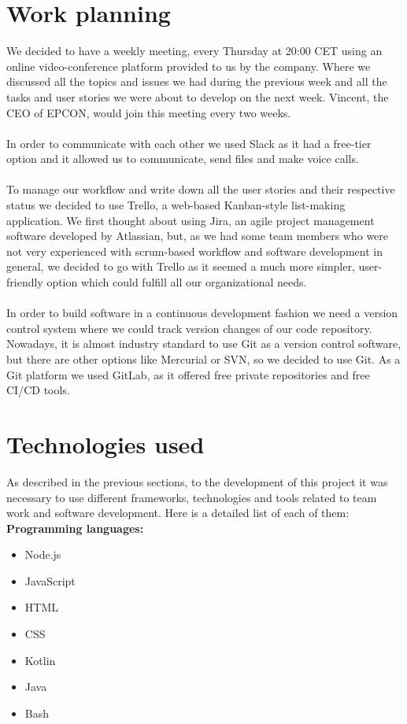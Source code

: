 \section{Work planning}

We decided to have a weekly meeting, every Thursday at 20:00 CET using an online video-conference platform provided to us by the company. Where we discussed all the topics and issues we had during the previous week and all the tasks and user stories we were about to develop on the next week. Vincent, the CEO of EPCON, would join this meeting every two weeks.
\\ \\
In order to communicate with each other we used Slack as it had a free-tier option and it allowed us to communicate, send files and make voice calls.
\\ \\
To manage our workflow and write down all the user stories and their respective status we decided to use Trello, a web-based Kanban-style list-making application. \cite{Trello} We first thought about using Jira, an agile project management software developed by Atlassian, but, as we had some team members who were not very experienced with scrum-based workflow and software development in general, we decided to go with Trello as it seemed a much more simpler, user-friendly option which could fulfill all our organizational needs.
\\ \\
In order to build software in a continuous development fashion we need a version control system where we could track version changes of our code repository. Nowadays, it is almost industry standard to use Git as a version control software, but there are other options like Mercurial or SVN, so we decided to use Git. As a Git platform we used GitLab, as it offered free private repositories and free CI/CD tools.

\section{Technologies used}

As described in the previous sections, to the development of this project it was necessary to use different frameworks, technologies and tools related to team work and software development. Here is a detailed list of each of them:
\\

\textbf{Programming languages:}

\begin{itemize}
\item
Node.js
\item
JavaScript
\item 
HTML
\item 
CSS
\item 
Kotlin
\item 
Java
\item 
Bash
\end{itemize}

